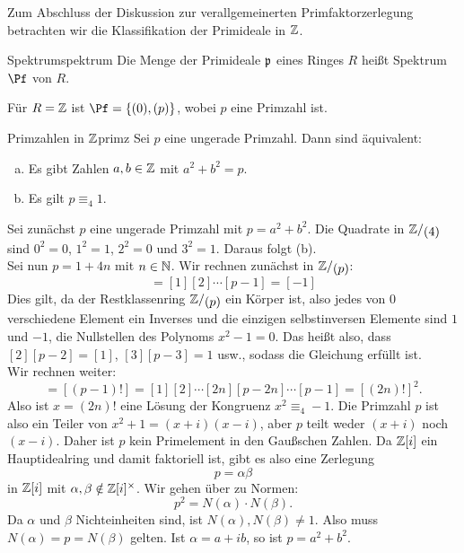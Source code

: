 Zum Abschluss der Diskussion zur verallgemeinerten Primfaktorzerlegung betrachten wir die Klassifikation der Primideale in $\mathbb{Z}$.
\begin{definition}{Spektrum}{spektrum}
Die Menge der Primideale $\mathfrak{p}$ eines Ringes $R$ heißt Spektrum $\Pf$ von $R$.
\end{definition}
\begin{bemerkung}
Für $R=\mathbb{Z}$ ist $\Pf = \{(0), (p)\}$, wobei $p$ eine Primzahl ist.
\end{bemerkung}
\begin{lemma}{Primzahlen in $\mathbb{Z}$}{primz}
Sei $p$ eine ungerade Primzahl. Dann sind äquivalent:
\begin{enumerate}[(a)]
\item Es gibt Zahlen $a,b \in \mathbb{Z}$ mit $a^2 + b^2 = p$.
\item Es gilt $p \equiv_4 1$.
\end{enumerate}
\end{lemma}
\begin{beweis}
Sei zunächst $p$ eine ungerade Primzahl mit $p = a^2 + b^2$. Die Quadrate in $\quotient{\Z}{(4)}$ sind $0^2 = 0$, $1^2 = 1$, $2^2 = 0$ und $3^2 = 1$. Daraus folgt (b).\\
Sei nun $p = 1 + 4n$ mit $n \in \mathbb{N}$. Wir rechnen zunächst in $\quotient{\Z}{(p)}$:
\begin{equation}
[(p-1)!] = [1] [2] \cdots [p-1] = [-1]
\end{equation}
Dies gilt, da der Restklassenring $\quotient{\Z}{(p)}$ ein Körper ist, also jedes von $0$ verschiedene Element ein Inverses und die einzigen selbstinversen Elemente sind $1$ und $-1$, die Nullstellen des Polynoms $x^2-1=0$. Das heißt also, dass $[2] [p-2] = [1]$, $[3][p-3]=1$ usw., sodass die Gleichung erfüllt ist.\\
Wir rechnen weiter:
\begin{equation}
[-1] = [(p-1)!] = [1][2] \cdots [2n][p-2n] \cdots [p-1]  = [(2n)!]^2.
\end{equation}
Also ist $x =(2n)!$ eine Lösung der Kongruenz $x^2 \equiv_4 -1$. Die Primzahl $p$ ist also ein Teiler von $x^2 +1 = (x+i)(x-i)$, aber $p$ teilt weder $(x+i)$ noch $(x-i)$. Daher ist $p$ kein Primelement in den Gaußschen Zahlen. Da $\mathbb{Z}[i]$ ein Hauptidealring und damit faktoriell ist, gibt es also eine Zerlegung
\begin{equation}
p = \alpha \beta
\end{equation}
in $\mathbb{Z}[i]$ mit $\alpha, \beta \notin \mathbb{Z}[i]^\times$. Wir gehen über zu Normen:
\begin{equation}
p^2 = N(\alpha) \cdot N(\beta).
\end{equation}
Da $\alpha$ und $\beta$ Nichteinheiten sind, ist $N(\alpha), N(\beta) \neq 1$. Also muss $N(\alpha) = p = N(\beta)$ gelten. Ist $\alpha = a+ib$, so ist $p = a^2 + b^2$.
\end{beweis}
